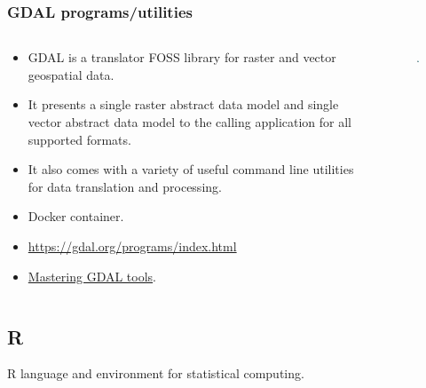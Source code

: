 \documentclass[aspectratio=169]{beamer}
\begin{document}
\begin{frame}
    \frametitle{GDAL programs/utilities}
    \begin{columns}
        \begin{column}{0.5\textwidth}
            \begin{itemize}
                \item GDAL is a translator FOSS library for raster and vector 
                    geospatial data.
                \item It presents a single raster abstract data model and
                    single vector abstract data model to the calling
                    application for all supported formats.
                \item It also comes with a variety of useful command line
                    utilities for data translation and processing.
                \item Docker container.
                \item \footnotesize{\url{https://gdal.org/programs/index.html}}
                \item \href{https://spatialthoughts.com/courses/mastering-gdal-tools/}{Mastering GDAL tools}.
            \end{itemize}
        \end{column}
        \begin{column}{0.5\textwidth}
            \begin{figure}
                \centering
                \includegraphics[scale=0.2]{logos/gdalicon.png}
            \end{figure}
        \end{column}
    \end{columns}
\end{frame}


\subsection{R}


\begin{frame}
    R language and environment for statistical computing.
\end{frame}
\end{document}
